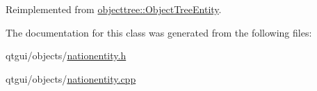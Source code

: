 Reimplemented from \mbox{\hyperlink{classobjecttree_1_1_object_tree_entity_ab6742194e637093cb1571998bee88ff5}{objecttree\+::\+Object\+Tree\+Entity}}.



The documentation for this class was generated from the following files\+:\begin{DoxyCompactItemize}
\item 
qtgui/objects/\mbox{\hyperlink{nationentity_8h}{nationentity.\+h}}\item 
qtgui/objects/\mbox{\hyperlink{nationentity_8cpp}{nationentity.\+cpp}}\end{DoxyCompactItemize}
